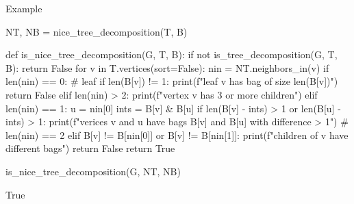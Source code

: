 Example
\begin{sageCell}
    NT, NB = nice_tree_decomposition(T, B)
\end{sageCell}

\begin{sageCell}
def is_nice_tree_decomposition(G, T, B):
    if not is_tree_decomposition(G, T, B):
        return False
    for v in T.vertices(sort=False):
        nin = NT.neighbors_in(v)
        if len(nin) == 0: # leaf
            if len(B[v]) != 1:
                print(f"leaf {v} has bag of size {len(B[v])}")
                return False
        elif len(nin) > 2:
            print(f"vertex {v} has 3 or more children")
        elif len(nin) == 1:
            u = nin[0]
            ints = B[v] & B[u]
            if len(B[v] - ints) > 1 or len(B[u] - ints) > 1:
                print(f"verices {v} and {u} have bags {B[v]} and {B[u]} with difference > 1")
        # len(nin) == 2
        elif B[v] != B[nin[0]] or B[v] != B[nin[1]]:
            print(f"children of {v} have different bags")
            return False
    return True
\end{sageCell}

\begin{sageCell}
    is_nice_tree_decomposition(G, NT, NB)
\end{sageCell}
\begin{outCell}
    True
\end{outCell}

